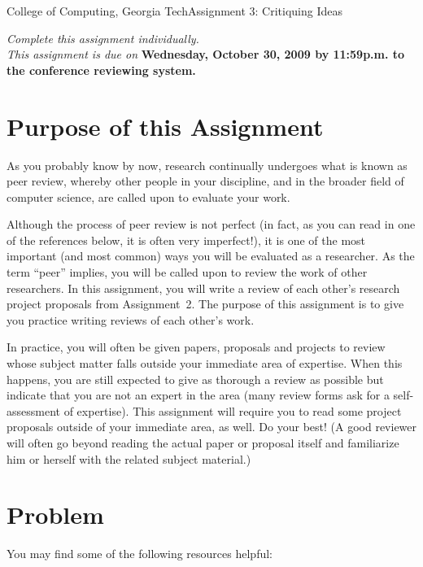 \documentclass[11pt]{article}
\begin{document}


{College of Computing, Georgia Tech}{Assignment 3: Critiquing Ideas}

{\em Complete this assignment individually. \\  This
  assignment is due on} {\bf Wednesday, October 30, 2009 by 11:59p.m. to
  the conference reviewing system.}

\section{Purpose of this Assignment}



As you probably know by now, research continually undergoes what is
known as peer review, whereby other people in your discipline, and in
the broader field of computer science, are called upon to evaluate your
work.  

Although the process of peer review is not perfect (in fact, as you can
read in one of the references below, it is often very imperfect!), it is
one of the most important (and most common) ways you will be evaluated
as a researcher.  As the term ``peer'' implies, you will be called upon
to review the work of other researchers.  In this assignment, you will
write a review of each other's research project proposals from
Assignment~2.  The purpose of this assignment is to give you practice
writing reviews of each other's work.

In practice, you will often be given papers, proposals and projects to
review whose subject matter falls outside your immediate area of
expertise.  When this happens, you are still expected to give as
thorough a review as possible but indicate that you are not an expert in
the area (many review forms ask for a self-assessment of expertise).
This assignment will require you to read some project proposals outside
of your immediate area, as well.  Do your best!  (A good reviewer will
often go beyond reading the actual paper or proposal itself and
familiarize him or herself with the related subject material.)

\section{Problem}



You may find some of the following resources helpful:
\end{document}
